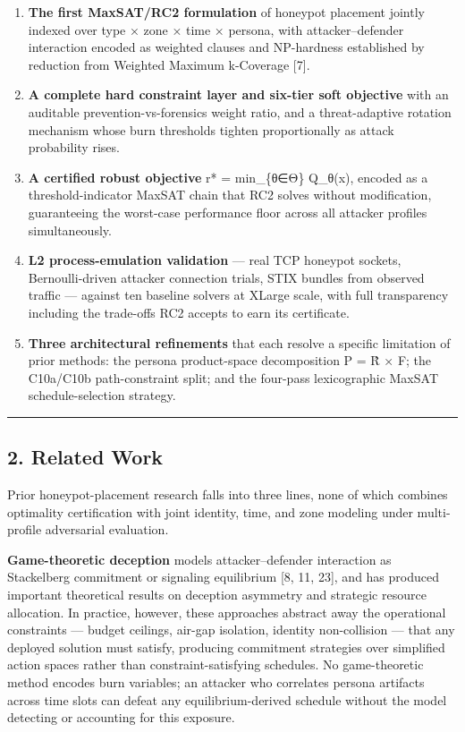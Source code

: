 \documentclass[
  11pt,
]{article}
\begin{document}
\begin{enumerate}
\def\labelenumi{\arabic{enumi}.}
\item
  \textbf{The first MaxSAT/RC2 formulation} of honeypot placement
  jointly indexed over type × zone × time × persona, with
  attacker--defender interaction encoded as weighted clauses and
  NP-hardness established by reduction from Weighted Maximum k-Coverage
  {[}7{]}.
\item
  \textbf{A complete hard constraint layer and six-tier soft objective}
  with an auditable prevention-vs-forensics weight ratio, and a
  threat-adaptive rotation mechanism whose burn thresholds tighten
  proportionally as attack probability rises.
\item
  \textbf{A certified robust objective} r* = min\_\{θ∈Θ\} Q\_θ(x),
  encoded as a threshold-indicator MaxSAT chain that RC2 solves without
  modification, guaranteeing the worst-case performance floor across all
  attacker profiles simultaneously.
\item
  \textbf{L2 process-emulation validation} --- real TCP honeypot
  sockets, Bernoulli-driven attacker connection trials, STIX bundles
  from observed traffic --- against ten baseline solvers at XLarge
  scale, with full transparency including the trade-offs RC2 accepts to
  earn its certificate.
\item
  \textbf{Three architectural refinements} that each resolve a specific
  limitation of prior methods: the persona product-space decomposition P
  = R̂ × F; the C10a/C10b path-constraint split; and the four-pass
  lexicographic MaxSAT schedule-selection strategy.
\end{enumerate}

\begin{center}\rule{0.5\linewidth}{0.5pt}\end{center}

\hypertarget{related-work}{%
\subsection{2. Related Work}\label{related-work}}

Prior honeypot-placement research falls into three lines, none of which
combines optimality certification with joint identity, time, and zone
modeling under multi-profile adversarial evaluation.

\textbf{Game-theoretic deception} models attacker--defender interaction
as Stackelberg commitment or signaling equilibrium {[}8, 11, 23{]}, and
has produced important theoretical results on deception asymmetry and
strategic resource allocation. In practice, however, these approaches
abstract away the operational constraints --- budget ceilings, air-gap
isolation, identity non-collision --- that any deployed solution must
satisfy, producing commitment strategies over simplified action spaces
rather than constraint-satisfying schedules. No game-theoretic method
encodes burn variables; an attacker who correlates persona artifacts
across time slots can defeat any equilibrium-derived schedule without
the model detecting or accounting for this exposure.
\end{document}

